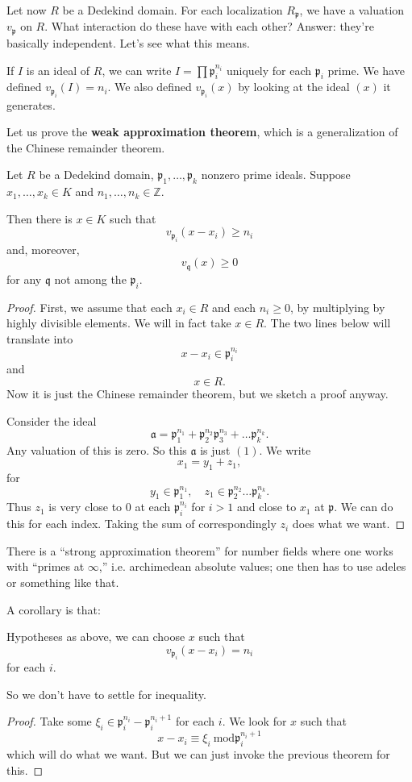 Let now $R$ be a Dedekind domain.
For each localization $R_{\mathfrak{p}}$, we have a valuation
$v_{\mathfrak{p}}$ on $R$. What interaction do these have with each other?
Answer: they're basically independent.
Let's see what this means.

If $I$ is an ideal of $R$, we can write $I = \prod \mathfrak{p}_i^{n_i}$
uniquely for each $\mathfrak{p}_i$ prime.  We have defined
$v_{\mathfrak{p}_i}(I) = n_i$.  
We also defined $v_{\mathfrak{p}_i}(x)$ by looking at the ideal $(x)$ it
generates. 

Let us prove the \textbf{weak approximation theorem}, which is a
generalization of the Chinese remainder theorem.

\begin{theorem} Let $R$ be a Dedekind domain,
$\mathfrak{p}_1, \dots, \mathfrak{p}_k$ nonzero prime ideals. Suppose $x_1,
\dots, x_k \in K$ and $n_1, \dots, n_{k} \in \mathbb{Z}$.

Then there is $x \in K$ such that
\[ v_{\mathfrak{p}_i}(x - x_i) \geq n_i  \]
and, moreover,
\[ v_{\mathfrak{q}}(x) \geq 0  \]
for any $\mathfrak{q}$ not among the $\mathfrak{p}_i$.
\end{theorem} 

\begin{proof} 
First, we assume that each $x_i \in R$ and each $n_i \geq 0$, by multiplying by
highly divisible elements.  We will in fact take $x \in R$. The two lines below will translate into
\[ x-x_i  \in \mathfrak{p}_i^{n_i}  \]
and
\[ x \in R.  \]
Now it is just the Chinese remainder theorem, but we sketch a proof anyway.

Consider the ideal
\[ \mathfrak{a} =  \mathfrak{p}_1^{n_1} + \mathfrak{p}_2^{n_2}\mathfrak{p}_3^{n_3}+\dots
\mathfrak{p}_k^{n_k}.  \]
Any valuation of this is zero. So this $\mathfrak{a}$ is just $(1)$. We write 
\[ x_1 = y_1 + z_1,  \]
for 
\[ y_1 \in \mathfrak{p}_1^{n_1}, \quad z_1 \in \mathfrak{p}_2^{n_2}\dots
\mathfrak{p}_k^{n_k}.  \]
Thus $z_1$ is very close to $0$ at each $\mathfrak{p}_i^{n_i}$ for $i >1$
and close to $x_1$ at $\mathfrak{p}$. We can do this for each index.  Taking
the sum of correspondingly $z_i$ does what we want. 
\end{proof} 

There is a ``strong approximation theorem'' for number fields where one works
with ``primes at  $\infty$,'' i.e. archimedean absolute values; one then has to
use adeles or something like that.

A corollary is that:
\begin{corollary} 
Hypotheses as above, we can choose $x$ such that
\[ v_{\mathfrak{p}_i}(x-x_i) = n_i  \]
for each $i$.
\end{corollary} 
So we don't have to settle for inequality.
\begin{proof} 
Take some $\xi_i \in \mathfrak{p}_i^{n_i} - \mathfrak{p}_i^{n_i+1}$ for each
$i$.  We look for $x$ such that 
\[ x - x_i \equiv  \xi_i \ \mathrm{mod} \mathfrak{p}_i^{n_i+1} \]
which will do what we want. But we can just invoke the previous theorem for
this. 
\end{proof} 

